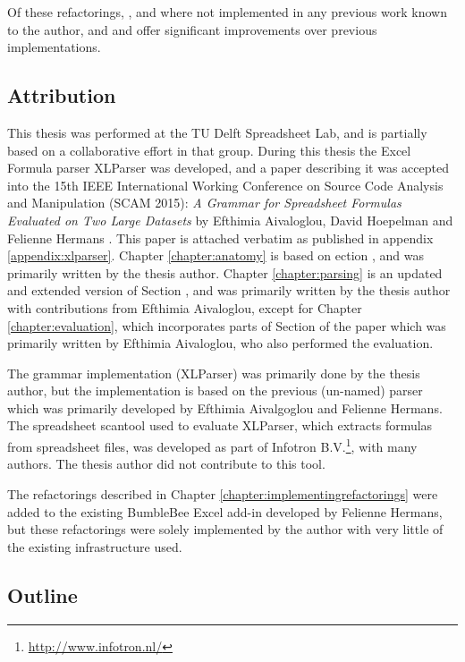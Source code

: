 Of these refactorings, ,  and  where not implemented in any previous work known to the author, and  and  offer significant improvements over previous implementations.

\newpage

\subsection{Attribution}

This thesis was performed at the TU Delft Spreadsheet Lab, and is partially based on a collaborative effort in that group.
During this thesis the Excel Formula parser XLParser was developed, and a paper describing it was accepted into the 15th IEEE International Working Conference on Source Code Analysis and Manipulation (SCAM 2015): \emph{A Grammar for Spreadsheet Formulas Evaluated on Two Large Datasets} by Efthimia Aivaloglou, David Hoepelman and Felienne Hermans \cite{xlparser}.
This paper is attached verbatim as published in appendix \ref{appendix:xlparser}.
Chapter \ref{chapter:anatomy} is based on ection , and was primarily written by the thesis author.
Chapter \ref{chapter:parsing} is an updated and extended version of Section , and was primarily written by the thesis author with contributions from Efthimia Aivaloglou, except for Chapter \ref{chapter:evaluation}, which incorporates parts of Section  of the paper which was primarily written by Efthimia Aivaloglou, who also performed the evaluation. 

The grammar implementation (XLParser) was primarily done by the thesis author, but the implementation is based on the previous (un-named) parser which was primarily developed by Efthimia Aivalgoglou and Felienne Hermans.
The spreadsheet scantool used to evaluate XLParser, which extracts formulas from spreadsheet files, was developed as part of Infotron B.V.\footnote{\url{http://www.infotron.nl/}}, with many authors. The thesis author did not contribute to this tool.

The refactorings described in Chapter \ref{chapter:implementingrefactorings} were added to the existing BumbleBee Excel add-in developed by Felienne Hermans, but these refactorings were solely implemented by the author with very little of the existing infrastructure used.

\subsection{Outline}

